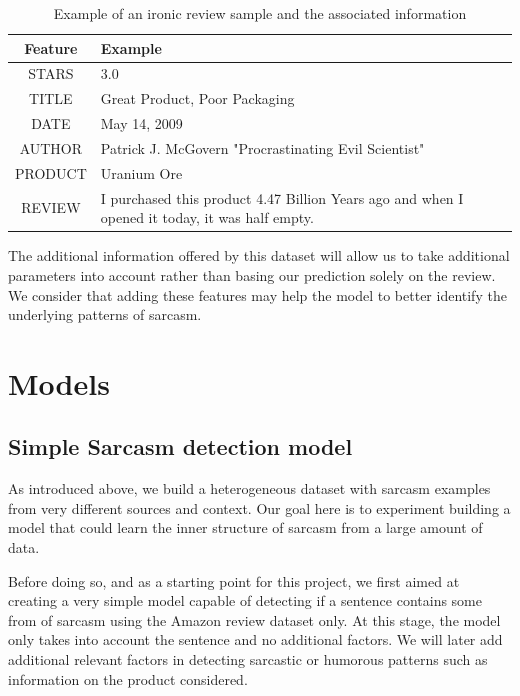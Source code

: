 \documentclass[10pt,twocolumn,letterpaper]{article}
\begin{document}
\begin{table}[H]
\centering
\small
\begin{tabular}{|c|p{6cm}|}
\hline
\textbf{Feature} & \textbf{Example} \\
\hline
STARS & 3.0 \\
TITLE & Great Product, Poor Packaging \\
DATE & May 14, 2009 \\
AUTHOR & Patrick J. McGovern "Procrastinating Evil Scientist"\\
PRODUCT & Uranium Ore \\
REVIEW & I purchased this product 4.47 Billion Years ago and when I opened it today, it was half empty. \\
\hline

\end{tabular}
\caption{Example of an ironic review sample and the associated information}
\label{tab:mytable}
\end{table}

The additional information offered by this dataset will allow us to take additional parameters into account rather than basing our prediction solely on the review.
We consider that adding these features may help the model to better identify the underlying patterns of sarcasm.






\section{Models}
\subsection{Simple Sarcasm detection model}
As introduced above, we build a heterogeneous dataset with sarcasm examples from very different sources and context.
Our goal here is to experiment building a model that could learn the inner structure of sarcasm from a large amount of data.

Before doing so, and as a starting point for this project, we first aimed at creating a very simple model capable of detecting if a sentence contains some from of sarcasm using the Amazon review dataset only.
At this stage, the model only takes into account the sentence and no additional factors. We will later add additional relevant factors in detecting sarcastic or humorous patterns such as information on the product considered.
\end{document}
